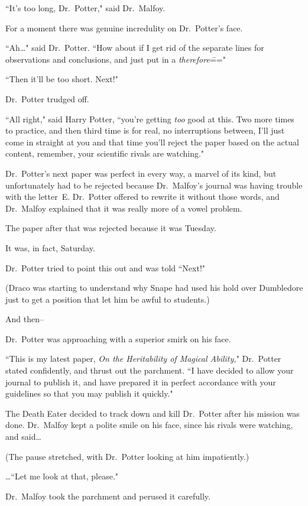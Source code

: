 ``It's too long, Dr.~Potter," said Dr.~Malfoy.

For a moment there was genuine incredulity on Dr.~Potter's face.

``Ah{\ldots}" said Dr.~Potter. ``How about if I get rid of the separate lines for observations and conclusions, and just put in a \emph{therefore}\==="

``Then it'll be too short. Next!"

Dr.~Potter trudged off.

``All right," said Harry Potter, ``you're getting \emph{too} good at this. Two more times to practice, and then third time is for real, no interruptions between, I'll just come in straight at you and that time you'll reject the paper based on the actual content, remember, your scientific rivals are watching."

Dr.~Potter's next paper was perfect in every way, a marvel of its kind, but unfortunately had to be rejected because Dr.~Malfoy's journal was having trouble with the letter~E\@. Dr.~Potter offered to rewrite it without those words, and Dr.~Malfoy explained that it was really more of a vowel problem.

The paper after that was rejected because it was Tuesday.

It was, in fact, Saturday.

Dr.~Potter tried to point this out and was told ``Next!"

(Draco was starting to understand why Snape had used his hold over Dumbledore just to get a position that let him be awful to students.)

And then\---

Dr.~Potter was approaching with a superior smirk on his face.

``This is my latest paper, \emph{On the Heritability of Magical Ability,}" Dr.~Potter stated confidently, and thrust out the parchment. ``I have decided to allow your journal to publish it, and have prepared it in perfect accordance with your guidelines so that you may publish it quickly."

The Death Eater decided to track down and kill Dr.~Potter after his mission was done. Dr.~Malfoy kept a polite smile on his face, since his rivals were watching, and said{\ldots}

(The pause stretched, with Dr.~Potter looking at him impatiently.)

{\ldots}``Let me look at that, please."

Dr.~Malfoy took the parchment and perused it carefully.

